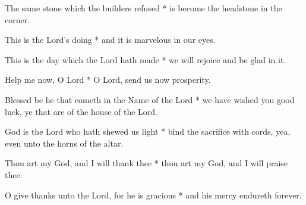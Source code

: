 The same stone which the builders refused * is become the headstone in the corner.

This is the Lord's doing * and it is marvelous in our eyes.

This is the day which the Lord hath made * we will rejoice and be glad in it.

Help me now, O Lord * O Lord, send us now prosperity.

Blessed be he that cometh in the Name of the Lord * we have wished you good luck, ye that are of the house of the Lord.

God is the Lord who hath shewed us light * bind the sacrifice with cords, yea, even unto the horns of the altar.

Thou art my God, and I will thank thee * thou art my God, and I will praise thee.

O give thanks unto the Lord, for he is gracious * and his mercy endureth forever.